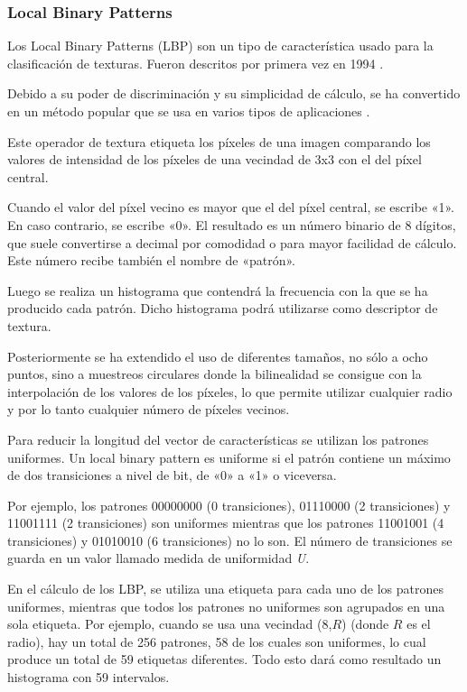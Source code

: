 \subsubsection*{Local Binary Patterns}
Los Local Binary Patterns (LBP) \cite{wiki:LocalBinaryPatterns} son un tipo de característica usado para la clasificación de texturas. Fueron descritos por primera vez en 1994 \cite{ojala}.

Debido a su poder de discriminación y su simplicidad de cálculo, se ha convertido en un método popular que se usa en varios tipos de aplicaciones \cite{de2011transformaciones}.

Este operador de textura etiqueta los píxeles de una imagen comparando los valores de intensidad de los píxeles de una vecindad de 3x3 con el del píxel central.

Cuando el valor del píxel vecino es mayor que el del píxel central, se escribe «1». En caso contrario, se escribe «0». El resultado es un número binario de 8 dígitos, que suele convertirse a decimal por comodidad o para mayor facilidad de cálculo. Este número recibe también el nombre de «patrón».

Luego se realiza un histograma que contendrá la frecuencia con la que se ha producido cada patrón. Dicho histograma podrá utilizarse como descriptor de textura.

Posteriormente se ha extendido el uso de diferentes tamaños, no sólo a ocho puntos, sino a muestreos circulares donde la bilinealidad se consigue con la interpolación de los valores de los píxeles, lo que permite utilizar cualquier radio y por lo tanto cualquier número de píxeles vecinos.

Para reducir la longitud del vector de características se utilizan los patrones uniformes. Un local binary pattern es uniforme si el patrón contiene un máximo de dos transiciones a nivel de bit, de «0» a «1» o viceversa.


Por ejemplo, los patrones 00000000 (0 transiciones), 01110000 (2 transiciones) y 11001111 (2 transiciones) son uniformes mientras que los patrones 11001001 (4 transiciones) y 01010010 (6 transiciones) no lo son. El número de transiciones se guarda en un valor llamado medida de uniformidad \textit{U}.

En el cálculo de los LBP, se utiliza una etiqueta para cada uno de los patrones uniformes, mientras que todos los patrones no uniformes son agrupados en una sola etiqueta. Por ejemplo, cuando se usa una vecindad (8,$R$) (donde $R$ es el radio), hay un total de 256 patrones, 58 de los cuales son uniformes, lo cual produce un total de 59 etiquetas diferentes. Todo esto dará como resultado un histograma con 59 intervalos.
\newpage

